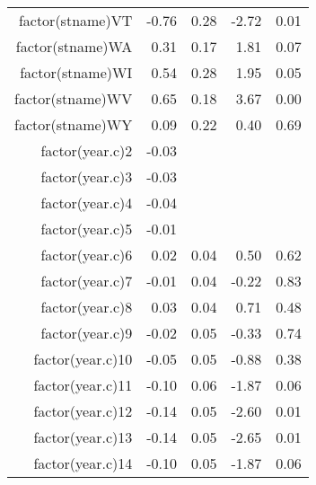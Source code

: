 \begin{table}[ht]
\begin{tabular}{rrrrr}
  factor(stname)VT & -0.76 & 0.28 & -2.72 & 0.01 \\ 
  factor(stname)WA & 0.31 & 0.17 & 1.81 & 0.07 \\ 
  factor(stname)WI & 0.54 & 0.28 & 1.95 & 0.05 \\ 
  factor(stname)WV & 0.65 & 0.18 & 3.67 & 0.00 \\ 
  factor(stname)WY & 0.09 & 0.22 & 0.40 & 0.69 \\ 
  factor(year.c)2 & -0.03 &  &  &  \\ 
  factor(year.c)3 & -0.03 &  &  &  \\ 
  factor(year.c)4 & -0.04 &  &  &  \\ 
  factor(year.c)5 & -0.01 &  &  &  \\ 
  factor(year.c)6 & 0.02 & 0.04 & 0.50 & 0.62 \\ 
  factor(year.c)7 & -0.01 & 0.04 & -0.22 & 0.83 \\ 
  factor(year.c)8 & 0.03 & 0.04 & 0.71 & 0.48 \\ 
  factor(year.c)9 & -0.02 & 0.05 & -0.33 & 0.74 \\ 
  factor(year.c)10 & -0.05 & 0.05 & -0.88 & 0.38 \\ 
  factor(year.c)11 & -0.10 & 0.06 & -1.87 & 0.06 \\ 
  factor(year.c)12 & -0.14 & 0.05 & -2.60 & 0.01 \\ 
  factor(year.c)13 & -0.14 & 0.05 & -2.65 & 0.01 \\ 
  factor(year.c)14 & -0.10 & 0.05 & -1.87 & 0.06 \\ 
   \hline
\end{tabular}
\end{table}
